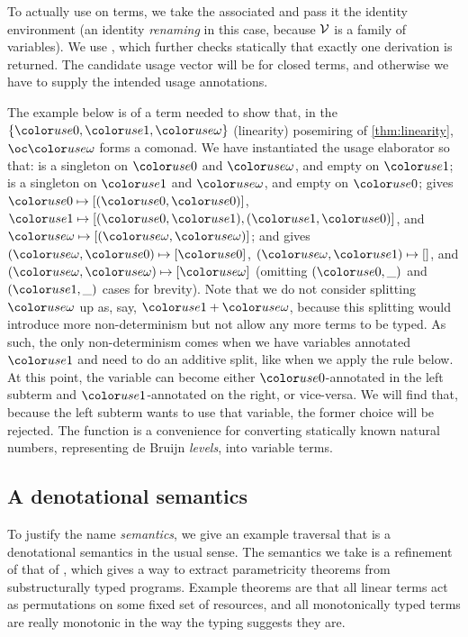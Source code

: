 To actually use  on terms, we take the associated
 and pass it the identity environment (an identity
\emph{renaming} in this case, because $\mathcal V$ is a family of variables).
We use , which further
checks statically that exactly one derivation is returned.
The candidate usage vector  will be \AgdaFunction{[]} for closed
terms, and otherwise we have to supply the intended usage annotations.

The example below is of a term needed to show that, in the
$\{\gr0, \gr1, \gr\omega\}$ (linearity) posemiring of \cref{thm:linearity},
$\oc\gr\omega$ forms a comonad.
We have instantiated the usage elaborator so that:
 is a singleton on $\gr0$ and $\gr\omega$, and empty on
$\gr1$;
 is a singleton on $\gr1$ and $\gr\omega$, and empty on
$\gr0$;
 gives $\gr0 \mapsto [(\gr0,\gr0)]$,
$\gr1 \mapsto [(\gr0,\gr1),(\gr1,\gr0)]$, and
$\gr\omega \mapsto [(\gr\omega,\gr\omega)]$; and
 gives $(\gr\omega, \gr0) \mapsto [\gr0]$,
$(\gr\omega, \gr1) \mapsto []$, and
$(\gr\omega, \gr\omega) \mapsto [\gr\omega]$
(omitting $(\gr0, \_)$ and $(\gr1, \_)$ cases for brevity).
Note that we do not consider splitting $\gr\omega$ up as, say,
$\gr1 + \gr\omega$, because this splitting would introduce more
non-determinism but not allow any more terms to be typed.
As such, the only non-determinism comes when we have variables annotated
$\gr1$ and need to do an additive split, like when we apply the
 rule below.
At this point, the variable can become either $\gr0$-annotated in the left
subterm and $\gr1$-annotated on the right, or vice-versa.
We will find that, because the left subterm wants to use that variable, the
former choice will be rejected.
The function  is a convenience for converting statically
known natural numbers, representing de Bruijn \emph{levels}, into variable
terms.


\subsection{A denotational semantics}

To justify the name \emph{semantics}, we give an example traversal that is a
denotational semantics in the usual sense.
The semantics we take is a refinement of that of \citet{AbelBernardy2020},
which gives a way to extract parametricity theorems from substructurally typed
programs.
Example theorems are that all linear terms act as permutations on some fixed
set of resources, and all monotonically typed terms are really monotonic in the
way the typing suggests they are.

